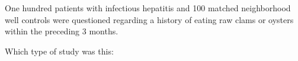 
One hundred patients with infectious hepatitis and 100 matched
neighborhood well controls were questioned regarding a history of
eating raw clams or oysters within the preceding 3 months.

Which type of study was this:
\begin{MultipleChoice}
\end{MultipleChoice}


